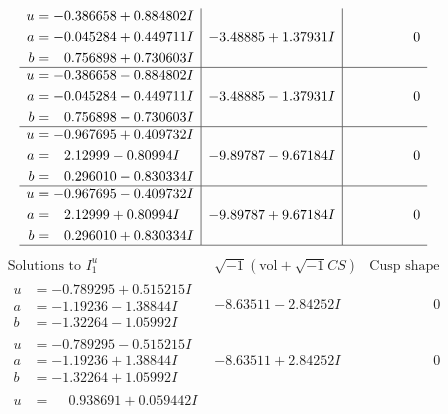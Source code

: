 \documentclass[1p]{elsarticle_modified}
\theoremstyle{definition}
\newcommand{\I}{\sqrt{-1}}
\begin{document}
$$\begin{array}{c|c|c}
\begin{aligned}
u &= -0.386658 + 0.884802 I \\
a &= -0.045284 + 0.449711 I \\
b &= \phantom{-}0.756898 + 0.730603 I\end{aligned}
 & -3.48885 + 1.37931 I & \phantom{-0.000000 } 0 \\ \hline\begin{aligned}
u &= -0.386658 - 0.884802 I \\
a &= -0.045284 - 0.449711 I \\
b &= \phantom{-}0.756898 - 0.730603 I\end{aligned}
 & -3.48885 - 1.37931 I & \phantom{-0.000000 } 0 \\ \hline\begin{aligned}
u &= -0.967695 + 0.409732 I \\
a &= \phantom{-}2.12999 - 0.80994 I \\
b &= \phantom{-}0.296010 - 0.830334 I\end{aligned}
 & -9.89787 - 9.67184 I & \phantom{-0.000000 } 0 \\ \hline\begin{aligned}
u &= -0.967695 - 0.409732 I \\
a &= \phantom{-}2.12999 + 0.80994 I \\
b &= \phantom{-}0.296010 + 0.830334 I\end{aligned}
 & -9.89787 + 9.67184 I & \phantom{-0.000000 } 0\\
 \hline 
 \end{array}$$\newpage$$\begin{array}{c|c|c}  
\text{Solutions to }I^u_{1}& \I (\text{vol} + \sqrt{-1}CS) & \text{Cusp shape}\\
 \hline 
\begin{aligned}
u &= -0.789295 + 0.515215 I \\
a &= -1.19236 - 1.38844 I \\
b &= -1.32264 - 1.05992 I\end{aligned}
 & -8.63511 - 2.84252 I & \phantom{-0.000000 } 0 \\ \hline\begin{aligned}
u &= -0.789295 - 0.515215 I \\
a &= -1.19236 + 1.38844 I \\
b &= -1.32264 + 1.05992 I\end{aligned}
 & -8.63511 + 2.84252 I & \phantom{-0.000000 } 0 \\ \hline\begin{aligned}
u &= \phantom{-}0.938691 + 0.059442 I \\

\end{aligned}
\end{array}$$
\end{document}
